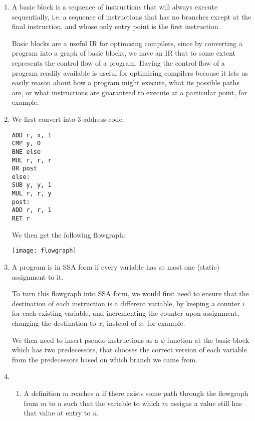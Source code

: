 


\begin{enumerate}[label=(\alph*)]
  \item
    A basic block is a sequence of instructions that will always execute sequentially, i.e. a sequence of instructions that has no branches except at the final instruction, and whose only entry point is the first instruction.

    Basic blocks are a useful IR for optimising compilers, since by converting a program into a graph of basic blocks, we have an IR that to some extent represents the control flow of a program. Having the control flow of a program readily available is useful for optimising compilers because it lets us easily reason about how a program might execute, what its possible paths are, or what instructions are guaranteed to execute at a particular point, for example.

  \item
    We first convert into 3-address code:

\begin{verbatim}
ADD r, x, 1
CMP y, 0
BNE else
MUL r, r, r
BR post
else:
SUB y, y, 1
MUL r, r, y
post:
ADD r, r, 1
RET r
\end{verbatim}

We then get the following flowgraph:

\texttt{[image: flowgraph]}

\item
  A program is in SSA form if every variable has at most one (static) assignment to it.

  To turn this flowgraph into SSA form, we would first need to ensure that the destination of each instruction is a different variable, by keeping a counter $i$ for each existing variable, and incrementing the counter upon assignment, changing the destination to $x_i$ instead of $x$, for example.

  We then need to insert pseudo instructions as a $\phi$ function at the basic block which has two predecessors, that chooses the correct version of each variable from the predecessors based on which branch we came from.

\item
  \begin{enumerate}[label=(\roman*)]

    \item
      A definition $m$ reaches $n$ if there exists some path through the flowgraph from $m$ to $n$ such that the variable to which $m$ assigns a value still has that value at entry to $n$.


\end{enumerate}
\end{enumerate}
